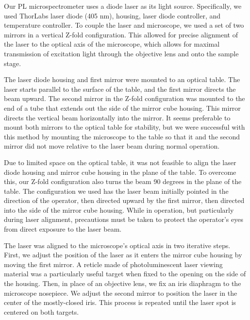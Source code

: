 Our PL microspectrometer uses a diode laser as its light source. Specifically, we used ThorLabs  laser diode (405 nm),  housing,  laser diode controller, and  temperature controller. To couple the laser and microscope, we used a set of two mirrors in a vertical Z-fold \cite{edmund_optics_simplifying_nodate} configuration. This allowed for precise alignment of the laser to the optical axis of the microscope, which allows for maximal transmission of excitation light through the objective lens and onto the sample stage.

The laser diode housing and first mirror were mounted to an optical table. The laser starts parallel to the surface of the table, and the first mirror directs the beam upward. The second mirror in the Z-fold configuration was mounted to the end of a tube that extends out the side of the mirror cube housing. This mirror directs the vertical beam horizontally into the mirror. It seems preferable to mount both mirrors to the optical table for stability, but we were successful with this method by mounting the microscope to the table so that it and the second mirror did not move relative to the laser beam during normal operation.

Due to limited space on the optical table, it was not feasible to align the laser diode housing and mirror cube housing in the plane of the table. To overcome this, our Z-fold configuration also turns the beam 90 degrees in the plane of the table. The configuration we used has the laser beam initially pointed in the direction of the operator, then directed upward by the first mirror, then directed into the side of the mirror cube housing. While in operation, but particularly during laser alignment, precautions must be taken to protect the operator's eyes from direct exposure to the laser beam.

The laser was aligned to the microscope's optical axis in two iterative steps. First, we adjust the position of the laser as it enters the mirror cube housing by moving the first mirror. A reticle made of photoluminescent laser viewing material was a particularly useful target when fixed to the opening on the side of the housing. Then, in place of an objective lens, we fix an iris diaphragm to the microscope nosepiece. We adjust the second mirror to position the laser in the center of the mostly-closed iris. This process is repeated until the laser spot is centered on both targets.




